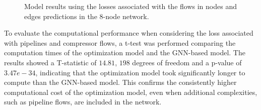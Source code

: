 \begin{figure}
    \centering
        \setlength{}        
        \setlength{} 
        \caption{Model results using the losses associated with the flows in nodes and edges predictions in the 8-node network.}
        \label{fig:dummy_base_f_results}
\end{figure}


To evaluate the computational performance when considering the loss associated with pipelines and compressor flows, a t-test was performed comparing the computation times of the optimization model and the GNN-based model. The results showed a T-statistic of $14.81$, $198$ degrees of freedom and a p-value of $3.47e-34$, indicating that the optimization model took significantly longer to compute than the GNN-based model. This confirms the consistently higher computational cost of the optimization model, even when additional complexities, such as pipeline flows, are included in the network.




